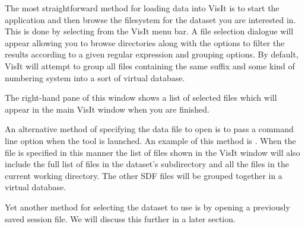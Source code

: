   The most straightforward method for loading data into VisIt is to
  start the application and then browse the filesystem for the dataset
  you are interested in. This is done by selecting  from the VisIt menu bar. A file selection dialogue will appear
  allowing you to browse directories along with the options to filter
  the results according to a given regular expression and grouping options.
  By default, VisIt will attempt to group all files containing the same
  suffix and some kind of numbering system into a sort of virtual database.

  The right-hand pane of this window shows a list of selected files which
  will appear in the main VisIt window when you are finished.

  An alternative method of specifying the data file to open is to pass
  a command line option when the tool is launched. An example of this
  method is . When the file is specified in
  this manner the list of files shown in the VisIt window will also
  include the full list of files in the dataset's subdirectory and
  all the files in the current working directory. The other SDF files
  will be grouped together in a virtual database.

  Yet another method for selecting the dataset to use is by opening a
  previously saved session file. We will discuss this further in a later
  section.

